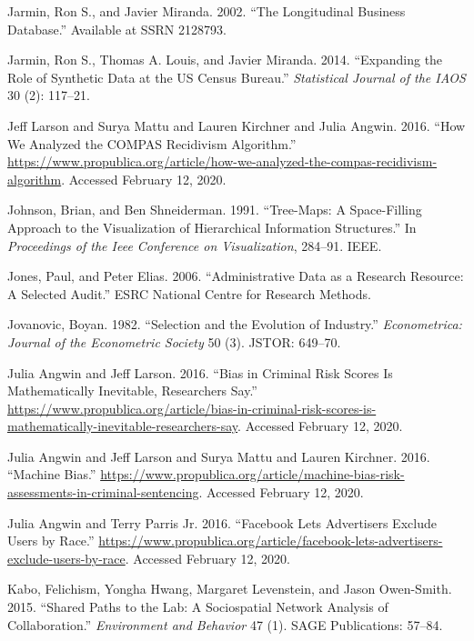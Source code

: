 \documentclass[]{krantz}
\begin{document}
\hypertarget{ref-jarmin2002longitudinal}{}
Jarmin, Ron S., and Javier Miranda. 2002. ``The Longitudinal Business
Database.'' Available at SSRN 2128793.

\hypertarget{ref-jarmin2014expanding}{}
Jarmin, Ron S., Thomas A. Louis, and Javier Miranda. 2014. ``Expanding
the Role of Synthetic Data at the US Census Bureau.'' \emph{Statistical
Journal of the IAOS} 30 (2): 117--21.

\hypertarget{ref-larson2016}{}
Jeff Larson and Surya Mattu and Lauren Kirchner and Julia Angwin. 2016.
``How We Analyzed the COMPAS Recidivism Algorithm.''
\url{https://www.propublica.org/article/how-we-analyzed-the-compas-recidivism-algorithm}.
Accessed February 12, 2020.

\hypertarget{ref-johnson1991tree}{}
Johnson, Brian, and Ben Shneiderman. 1991. ``Tree-Maps: A Space-Filling
Approach to the Visualization of Hierarchical Information Structures.''
In \emph{Proceedings of the Ieee Conference on Visualization}, 284--91.
IEEE.

\hypertarget{ref-jones2006administrative}{}
Jones, Paul, and Peter Elias. 2006. ``Administrative Data as a Research
Resource: A Selected Audit.'' ESRC National Centre for Research Methods.

\hypertarget{ref-jovanovic1982selection}{}
Jovanovic, Boyan. 1982. ``Selection and the Evolution of Industry.''
\emph{Econometrica: Journal of the Econometric Society} 50 (3). JSTOR:
649--70.

\hypertarget{ref-angwin2016b}{}
Julia Angwin and Jeff Larson. 2016. ``Bias in Criminal Risk Scores Is
Mathematically Inevitable, Researchers Say.''
\url{https://www.propublica.org/article/bias-in-criminal-risk-scores-is-mathematically-inevitable-researchers-say}.
Accessed February 12, 2020.

\hypertarget{ref-angwin2016}{}
Julia Angwin and Jeff Larson and Surya Mattu and Lauren Kirchner. 2016.
``Machine Bias.''
\url{https://www.propublica.org/article/machine-bias-risk-assessments-in-criminal-sentencing}.
Accessed February 12, 2020.

\hypertarget{ref-angwin2016c}{}
Julia Angwin and Terry Parris Jr. 2016. ``Facebook Lets Advertisers
Exclude Users by Race.''
\url{https://www.propublica.org/article/facebook-lets-advertisers-exclude-users-by-race}.
Accessed February 12, 2020.

\hypertarget{ref-kabo2015shared}{}
Kabo, Felichism, Yongha Hwang, Margaret Levenstein, and Jason
Owen-Smith. 2015. ``Shared Paths to the Lab: A Sociospatial Network
Analysis of Collaboration.'' \emph{Environment and Behavior} 47 (1).
SAGE Publications: 57--84.
\end{document}
